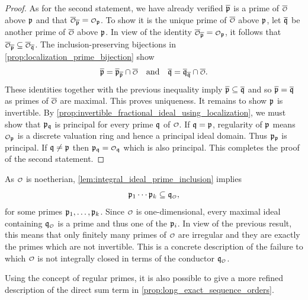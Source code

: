 \begin{proof}
      As for the second statement, we have already verified \(\overline{\mathfrak{p}}\) is a prime of \(\conj{\smc{O}}\) above \(\mathfrak{p}\) and that \(\conj{\smc{O}}_{\conj{\mf{p}}} = \smc{O}_{\mf{p}}\). To show it is the unique prime of \(\conj{\smc{O}}\) above \(\mathfrak{p}\), let \(\overline{\mathfrak{q}}\) be another prime of \(\conj{\smc{O}}\) above \(\mathfrak{p}\). In view of the identity \(\conj{\smc{O}}_{\conj{\mf{p}}} = \smc{O}_{\mf{p}}\), it follows that \(\conj{\smc{O}}_{\conj{\mf{p}}} \subseteq \conj{\smc{O}}_{\conj{\mf{q}}}\). The inclusion-preserving bijections in \cref{prop:localization_prime_bijection} show 
      \[
        \conj{\mf{p}} = \conj{\mf{p}}_{\conj{\mf{p}}} \cap \conj{\smc{O}} \quad \text{and} \quad \conj{\mf{q}} = \conj{\mf{q}}_{\conj{\mf{q}}} \cap \conj{\smc{O}}.
      \]
      These identities together with the previous inequality imply \(\overline{\mathfrak{p}} \subseteq \overline{\mathfrak{q}}\) and so \(\overline{\mathfrak{p}} = \overline{\mathfrak{q}}\) as primes of \(\conj{\smc{O}}\) are maximal. This proves uniqueness. It remains to show \(\mathfrak{p}\) is invertible. By \cref{prop:invertible_fractional_ideal_using_localization}, we must show that \(\mathfrak{p}_{\mathfrak{q}}\) is principal for every prime \(\mathfrak{q}\) of \(\smc{O}\). If \(\mathfrak{q} = \mathfrak{p}\), regularity of \(\mathfrak{p}\) means \(\smc{O}_{\mf{p}}\) is a discrete valuation ring and hence a principal ideal domain. Thus \(\mathfrak{p}_{\mathfrak{p}}\) is principal. If \(\mathfrak{q} \neq \mathfrak{p}\) then \(\mf{p}_{\mf{q}} = \smc{O}_{\mf{q}}\) which is also principal. This completes the proof of the second statement.
    \end{proof}

    As \(\smc{O}\) is noetherian, \cref{lem:integral_ideal_prime_inclusion} implies
    \[
      \mf{p}_{1} \cdots \mf{p}_{k} \subseteq \mf{q}_{\smc{O}},
    \]
    for some primes \(\mathfrak{p}_{1},\ldots,\mathfrak{p}_{k}\). Since \(\smc{O}\) is one-dimensional, every maximal ideal containing \(\mf{q}_{\smc{O}}\) is a prime and thus one of the \(\mathfrak{p}_{i}\). In view of the previous result, this means that only finitely many primes of \(\smc{O}\) are irregular and they are exactly the primes which are not invertible. This is a concrete description of the failure to which \(\smc{O}\) is not integrally closed in terms of the conductor \(\mf{q}_{\smc{O}}\).

    Using the concept of regular primes, it is also possible to give a more refined description of the direct sum term in \cref{prop:long_exact_sequence_orders}.

